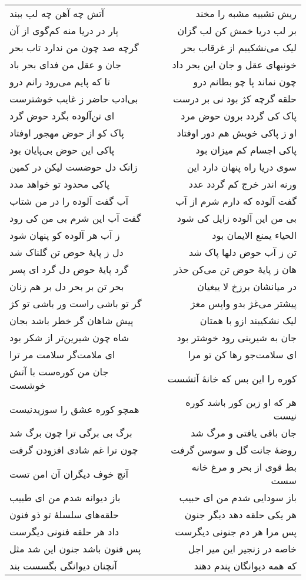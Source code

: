 \begin{center}
\begin{longtable}{l p{0.5cm} r}
آتش چه آهن چه لب ببند
&&
ریش تشبیه مشبه را مخند
\\
پار در دریا منه کم‌گوی از آن
&&
بر لب دریا خمش کن لب گزان
\\
گرچه صد چون من ندارد تاب بحر
&&
لیک می‌نشکیبم از غرقاب بحر
\\
جان و عقل من فدای بحر باد
&&
خونبهای عقل و جان این بحر داد
\\
تا که پایم می‌رود رانم درو
&&
چون نماند پا چو بطانم درو
\\
بی‌ادب حاضر ز غایب خوشترست
&&
حلقه گرچه کژ بود نی بر درست
\\
ای تن‌آلوده بگرد حوض گرد
&&
پاک کی گردد برون حوض مرد
\\
پاک کو از حوض مهجور اوفتاد
&&
او ز پاکی خویش هم دور اوفتاد
\\
پاکی این حوض بی‌پایان بود
&&
پاکی اجسام کم میزان بود
\\
زانک دل حوضست لیکن در کمین
&&
سوی دریا راه پنهان دارد این
\\
پاکی محدود تو خواهد مدد
&&
ورنه اندر خرج کم گردد عدد
\\
آب گفت آلوده را در من شتاب
&&
گفت آلوده که دارم شرم از آب
\\
گفت آب این شرم بی من کی رود
&&
بی من این آلوده زایل کی شود
\\
ز آب هر آلوده کو پنهان شود
&&
الحیاء یمنع الایمان بود
\\
دل ز پایهٔ حوض تن گلناک شد
&&
تن ز آب حوض دلها پاک شد
\\
گرد پایهٔ حوض دل گرد ای پسر
&&
هان ز پایهٔ حوض تن می‌کن حذر
\\
بحر تن بر بحر دل بر هم زنان
&&
در میانشان برزخ لا یبغیان
\\
گر تو باشی راست ور باشی تو کژ
&&
پیشتر می‌غژ بدو واپس مغژ
\\
پیش شاهان گر خطر باشد بجان
&&
لیک نشکیبند ازو با همتان
\\
شاه چون شیرین‌تر از شکر بود
&&
جان به شیرینی رود خوشتر بود
\\
ای ملامت‌گر سلامت مر ترا
&&
ای سلامت‌جو رها کن تو مرا
\\
جان من کوره‌ست با آتش خوشست
&&
کوره را این بس که خانهٔ آتشست
\\
همچو کوره عشق را سوزیدنیست
&&
هر که او زین کور باشد کوره نیست
\\
برگ بی برگی ترا چون برگ شد
&&
جان باقی یافتی و مرگ شد
\\
چون ترا غم شادی افزودن گرفت
&&
روضهٔ جانت گل و سوسن گرفت
\\
آنچ خوف دیگران آن امن تست
&&
بط قوی از بحر و مرغ خانه سست
\\
باز دیوانه شدم من ای طبیب
&&
باز سودایی شدم من ای حبیب
\\
حلقه‌های سلسلهٔ تو ذو فنون
&&
هر یکی حلقه دهد دیگر جنون
\\
داد هر حلقه فنونی دیگرست
&&
پس مرا هر دم جنونی دیگرست
\\
پس فنون باشد جنون این شد مثل
&&
خاصه در زنجیر این میر اجل
\\
آنچنان دیوانگی بگسست بند
&&
که همه دیوانگان پندم دهند
\\
\end{longtable}
\end{center}
